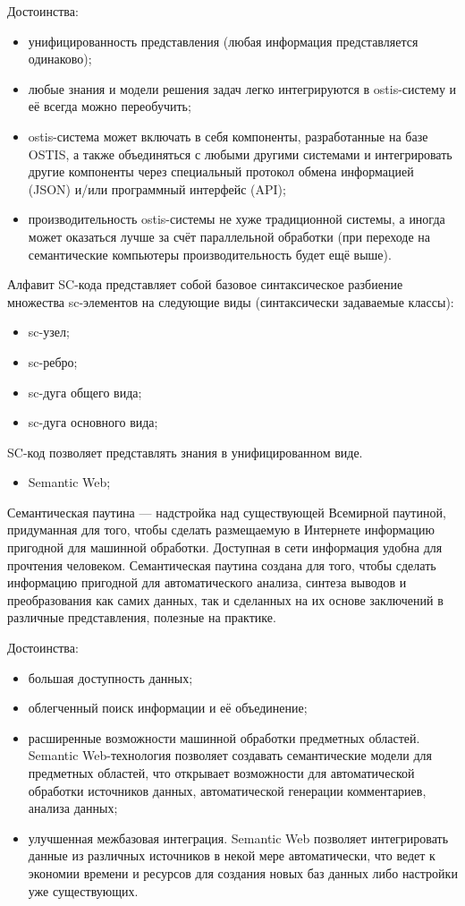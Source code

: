 Достоинства:
\begin{itemize}
	\item унифицированность представления (любая информация представляется одинаково);
	\item любые знания и модели решения задач легко интегрируются в ostis-систему и её всегда можно переобучить;
	\item ostis-система может включать в себя компоненты, разработанные на базе OSTIS, а также объединяться с любыми другими системами и интегрировать другие компоненты через специальный протокол обмена информацией (JSON) и/или программный интерфейс (API);
	\item производительность ostis-системы не хуже традиционной системы, а иногда может оказаться лучше за счёт параллельной обработки (при переходе на семантические компьютеры производительность будет ещё выше).
\end{itemize}

Алфавит SC-кода представляет собой базовое синтаксическое разбиение множества sc-элементов на следующие виды (синтаксически задаваемые классы):
\begin{itemize}
	\item sc-узел;
	\item sc-ребро;
	\item sc-дуга общего вида;
	\item sc-дуга основного вида;
\end{itemize}

SC-код позволяет представлять знания в унифицированном виде.\\

\begin{itemize}
	\item Semantic Web;
\end{itemize}

Семантическая паутина — надстройка над существующей Всемирной паутиной, придуманная для того, чтобы сделать размещаемую в Интернете информацию пригодной для машинной обработки. Доступная в сети информация удобна для прочтения человеком. Семантическая паутина создана для того, чтобы сделать информацию пригодной для автоматического анализа, синтеза выводов и преобразования как самих данных, так и сделанных на их основе заключений в различные представления, полезные на практике. 

Достоинства:
\begin{itemize}
	\item большая доступность данных;
	\item облегченный поиск информации и её объединение;
	\item расширенные возможности машинной обработки предметных областей. Semantic Web-технология позволяет создавать семантические модели для предметных областей, что открывает возможности для автоматической обработки источников данных, автоматической генерации комментариев, анализа данных;
	\item улучшенная межбазовая интеграция. Semantic Web позволяет интегрировать данные из различных источников в некой мере автоматически, что ведет к экономии времени и ресурсов для создания новых баз данных либо настройки уже существующих. 
\end{itemize}

